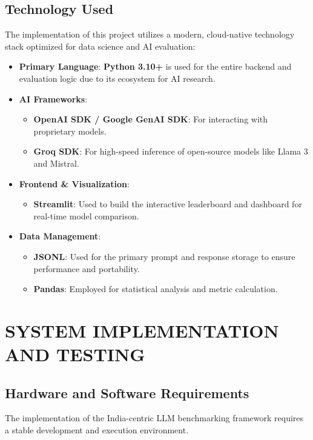 \documentclass[12pt, a4paper, onecolumn]{report}
\begin{document}
\section{Technology Used}
The implementation of this project utilizes a modern, cloud-native technology stack optimized for data science and AI evaluation:
\begin{itemize}
    \item \textbf{Primary Language}: \textbf{Python 3.10+} is used for the entire backend and evaluation logic due to its ecosystem for AI research.
    \item \textbf{AI Frameworks}: 
    \begin{itemize}
        \item \textbf{OpenAI SDK / Google GenAI SDK}: For interacting with proprietary models.
        \item \textbf{Groq SDK}: For high-speed inference of open-source models like Llama 3 and Mistral.
    \end{itemize}
    \item \textbf{Frontend \& Visualization}: 
    \begin{itemize}
        \item \textbf{Streamlit}: Used to build the interactive leaderboard and dashboard for real-time model comparison.
    \end{itemize}
    \item \textbf{Data Management}: 
    \begin{itemize}
        \item \textbf{JSONL}: Used for the primary prompt and response storage to ensure performance and portability.
        \item \textbf{Pandas}: Employed for statistical analysis and metric calculation.
    \end{itemize}
\end{itemize}

\chapter{SYSTEM IMPLEMENTATION AND TESTING}

\section{Hardware and Software Requirements}
The implementation of the India-centric LLM benchmarking framework requires a stable development and execution environment.
\end{document}
